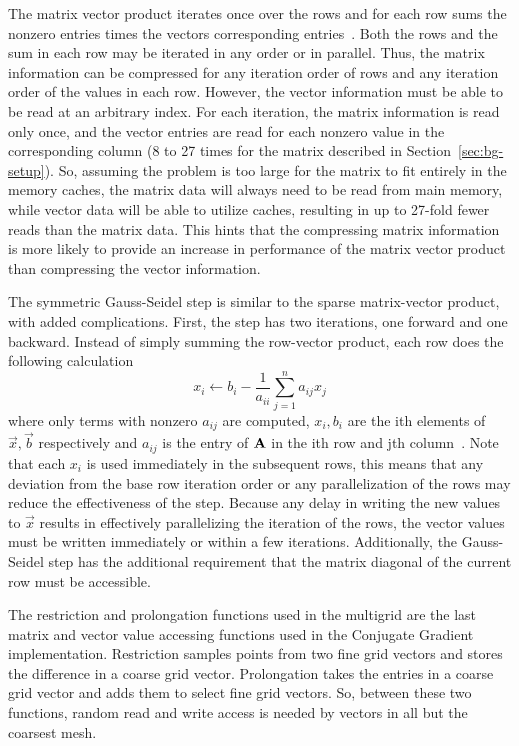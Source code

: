 The matrix vector product iterates once over the rows and for each row sums the nonzero entries times the vectors corresponding entries~\cite{Dongarra:2015:HPCG}.
Both the rows and the sum in each row may be iterated in any order or in parallel.
Thus, the matrix information can be compressed for any iteration order of rows and any iteration order of the values in each row.
However, the vector information must be able to be read at an arbitrary index.
For each iteration, the matrix information is read only once, and the vector entries are read for each nonzero value in the corresponding column (8 to 27 times for the matrix described in Section~\ref{sec:bg-setup}).
So, assuming the problem is too large for the matrix to fit entirely in the memory caches, the matrix data will always need to be read from main memory, while vector data will be able to utilize caches, resulting in up to 27-fold fewer reads than the matrix data.
This hints that the compressing matrix information is more likely to provide an increase in performance of the matrix vector product than compressing the vector information.

The symmetric Gauss-Seidel step is similar to the sparse matrix-vector product, with added complications.
First, the step has two iterations, one forward and one backward.
Instead of simply summing the row-vector product, each row does the following calculation
\[
	x_i \gets b_i - \frac{1}{a_{ii}}\sum_{j=1}^{n}a_{ij}x_j
\]
where only terms with nonzero \(a_{ij}\) are computed, \(x_i, b_i\) are the ith elements of \(\vec{x}, \vec{b}\) respectively and \(a_{ij}\) is the entry of \(\mathbf{A}\) in the ith row and jth column~\cite{Dongarra:2015:HPCG}.
Note that each \(x_i\) is used immediately in the subsequent rows, this means that any deviation from the base row iteration order or any parallelization of the rows may reduce the effectiveness of the step.
Because any delay in writing the new values to \(\vec{x}\) results in effectively parallelizing the iteration of the rows, the vector values must be written immediately or within a few iterations.
Additionally, the Gauss-Seidel step has the additional requirement that the matrix diagonal of the current row must be accessible.

The restriction and prolongation functions used in the multigrid are the last matrix and vector value accessing functions used in the Conjugate Gradient implementation.
Restriction samples points from two fine grid vectors and stores the difference in a coarse grid vector.
Prolongation takes the entries in a coarse grid vector and adds them to select fine grid vectors.
So, between these two functions, random read and write access is needed by vectors in all but the coarsest mesh.

